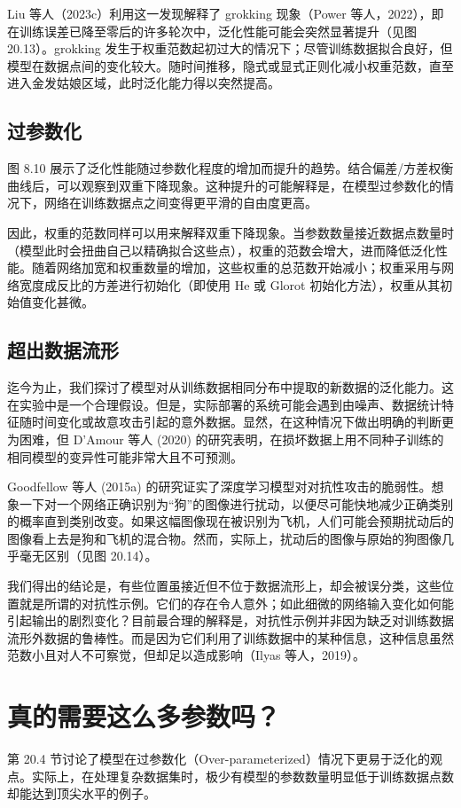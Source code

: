 Liu 等人（2023c）利用这一发现解释了 grokking 现象（Power 等人，2022），即在训练误差已降至零后的许多轮次中，泛化性能可能会突然显著提升（见图 20.13）。grokking 发生于权重范数起初过大的情况下；尽管训练数据拟合良好，但模型在数据点间的变化较大。随时间推移，隐式或显式正则化减小权重范数，直至进入金发姑娘区域，此时泛化能力得以突然提高。

\subsection{过参数化}
图 8.10 展示了泛化性能随过参数化程度的增加而提升的趋势。结合偏差/方差权衡曲线后，可以观察到双重下降现象。这种提升的可能解释是，在模型过参数化的情况下，网络在训练数据点之间变得更平滑的自由度更高。

因此，权重的范数同样可以用来解释双重下降现象。当参数数量接近数据点数量时（模型此时会扭曲自己以精确拟合这些点），权重的范数会增大，进而降低泛化性能。随着网络加宽和权重数量的增加，这些权重的总范数开始减小；权重采用与网络宽度成反比的方差进行初始化（即使用 He 或 Glorot 初始化方法），权重从其初始值变化甚微。

\subsection{超出数据流形}
迄今为止，我们探讨了模型对从训练数据相同分布中提取的新数据的泛化能力。这在实验中是一个合理假设。但是，实际部署的系统可能会遇到由噪声、数据统计特征随时间变化或故意攻击引起的意外数据。显然，在这种情况下做出明确的判断更为困难，但 D’Amour 等人 (2020) 的研究表明，在损坏数据上用不同种子训练的相同模型的变异性可能非常大且不可预测。

Goodfellow 等人 (2015a) 的研究证实了深度学习模型对对抗性攻击的脆弱性。想象一下对一个网络正确识别为“狗”的图像进行扰动，以便尽可能快地减少正确类别的概率直到类别改变。如果这幅图像现在被识别为飞机，人们可能会预期扰动后的图像看上去是狗和飞机的混合物。然而，实际上，扰动后的图像与原始的狗图像几乎毫无区别（见图 20.14）。

我们得出的结论是，有些位置虽接近但不位于数据流形上，却会被误分类，这些位置就是所谓的对抗性示例。它们的存在令人意外；如此细微的网络输入变化如何能引起输出的剧烈变化？目前最合理的解释是，对抗性示例并非因为缺乏对训练数据流形外数据的鲁棒性。而是因为它们利用了训练数据中的某种信息，这种信息虽然范数小且对人不可察觉，但却足以造成影响（Ilyas 等人，2019）。

\section{真的需要这么多参数吗？}
第 20.4 节讨论了模型在过参数化（Over-parameterized）情况下更易于泛化的观点。实际上，在处理复杂数据集时，极少有模型的参数数量明显低于训练数据点数却能达到顶尖水平的例子。

